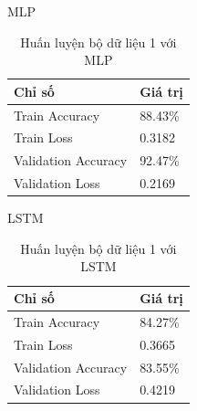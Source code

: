 \documentclass[13pt]{article}
\begin{document}
MLP
\begin{table}[h]
    \centering
    \renewcommand{\arraystretch}{1.4} %
    \begin{tabular}{|p{5cm}|p{3cm}|}
        \hline
        \rowcolor[HTML]{C0C0C0} %
        \textbf{Chỉ số} & \textbf{Giá trị} \\ 
        \hline
        Train Accuracy & 88.43\% \\ 
        \hline
        Train Loss & 0.3182 \\ 
        \hline
        Validation Accuracy & 92.47\% \\ 
        \hline
        Validation Loss & 0.2169 \\ 
        \hline
    \end{tabular}
    \caption{Huấn luyện bộ dữ liệu 1 với MLP}
    \label{tab:mlp_training}
\end{table}

LSTM
\begin{table}[h]
    \centering
    \renewcommand{\arraystretch}{1.4} %
    \begin{tabular}{|p{5cm}|p{3cm}|}
        \hline
        \rowcolor[HTML]{C0C0C0} %
        \textbf{Chỉ số} & \textbf{Giá trị} \\ 
        \hline
        Train Accuracy & 84.27\% \\ 
        \hline
        Train Loss & 0.3665 \\ 
        \hline
        Validation Accuracy & 83.55\% \\ 
        \hline
        Validation Loss & 0.4219 \\ 
        \hline
    \end{tabular}
    \caption{Huấn luyện bộ dữ liệu 1 với LSTM}
    \label{tab:mlp_training}
\end{table}

\newpage
\end{document}
